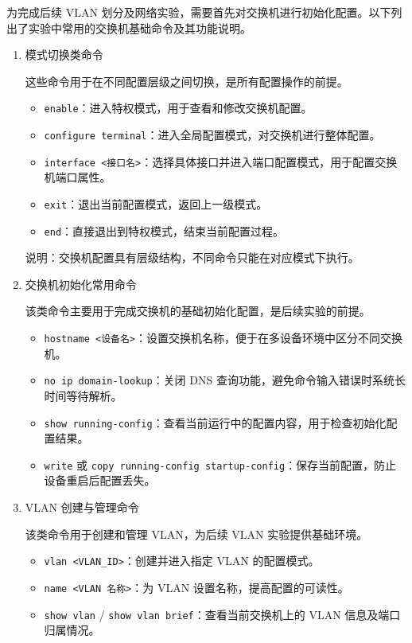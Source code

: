 \documentclass[UTF8,12pt,a4paper]{ctexart}
\begin{document}

为完成后续 VLAN 划分及网络实验，需要首先对交换机进行初始化配置。以下列出了实验中常用的交换机基础命令及其功能说明。
\begin{enumerate}[label=（\arabic*）, leftmargin=2em, itemsep=1em]

  \item {\heiti 模式切换类命令}

  这些命令用于在不同配置层级之间切换，是所有配置操作的前提。

  \begin{itemize}
    \item \texttt{enable}：进入特权模式，用于查看和修改交换机配置。
    \item \texttt{configure terminal}：进入全局配置模式，对交换机进行整体配置。
    \item \texttt{interface <接口名>}：选择具体接口并进入端口配置模式，用于配置交换机端口属性。
    \item \texttt{exit}：退出当前配置模式，返回上一级模式。
    \item \texttt{end}：直接退出到特权模式，结束当前配置过程。
  \end{itemize}

  {\heiti 说明：}交换机配置具有层级结构，不同命令只能在对应模式下执行。

  \item {\heiti 交换机初始化常用命令}

  该类命令主要用于完成交换机的基础初始化配置，是后续实验的前提。

  \begin{itemize}
    \item \texttt{hostname <设备名>}：设置交换机名称，便于在多设备环境中区分不同交换机。
    \item \texttt{no ip domain-lookup}：关闭 DNS 查询功能，避免命令输入错误时系统长时间等待解析。
    \item \texttt{show running-config}：查看当前运行中的配置内容，用于检查初始化配置结果。
    \item \texttt{write} 或 \texttt{copy running-config startup-config}：保存当前配置，防止设备重启后配置丢失。
  \end{itemize}

  \item {\heiti VLAN 创建与管理命令}

  该类命令用于创建和管理 VLAN，为后续 VLAN 实验提供基础环境。

  \begin{itemize}
    \item \texttt{vlan <VLAN\_ID>}：创建并进入指定 VLAN 的配置模式。
    \item \texttt{name <VLAN 名称>}：为 VLAN 设置名称，提高配置的可读性。
    \item \texttt{show vlan} / \texttt{show vlan brief}：查看当前交换机上的 VLAN 信息及端口归属情况。
  \end{itemize}


\end{enumerate}
\end{document}
